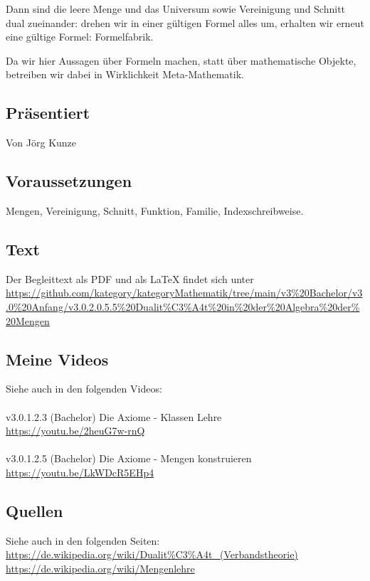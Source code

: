 \documentclass[a4paper]{amsart}
\theoremstyle{definition}
\begin{document}
Dann sind die leere Menge und das Universum sowie Vereinigung und Schnitt dual zueinander: drehen wir in einer gültigen Formel alles um, erhalten wir erneut eine gültige Formel: Formelfabrik.

Da wir hier Aussagen über Formeln machen, statt über mathematische Objekte, betreiben wir dabei in Wirklichkeit Meta-Mathematik.

\subsection*{Präsentiert}
Von Jörg Kunze

\subsection*{Voraussetzungen}
Mengen, Vereinigung, Schnitt, Funktion, Familie, Indexschreibweise.

\subsection*{Text}
Der Begleittext als PDF und als LaTeX findet sich unter
{\tiny
   \url{https://github.com/kategory/kategoryMathematik/tree/main/v3%20Bachelor/v3.0%20Anfang/v3.0.2.0.5.5%20Dualit%C3%A4t%20in%20der%20Algebra%20der%20Mengen}
}

\subsection*{Meine Videos}
Siehe auch in den folgenden Videos:\\
\\
v3.0.1.2.3 (Bachelor) Die Axiome - Klassen Lehre\\
\url{https://youtu.be/2heuG7w-rnQ}\\
\\
v3.0.1.2.5 (Bachelor) Die Axiome - Mengen konstruieren\\
\url{https://youtu.be/LkWDcR5EHp4}\\

\subsection*{Quellen}
Siehe auch in den folgenden Seiten:\\
\url{https://de.wikipedia.org/wiki/Dualit%C3%A4t_(Verbandstheorie)}\\
\url{https://de.wikipedia.org/wiki/Mengenlehre}
\end{document}
